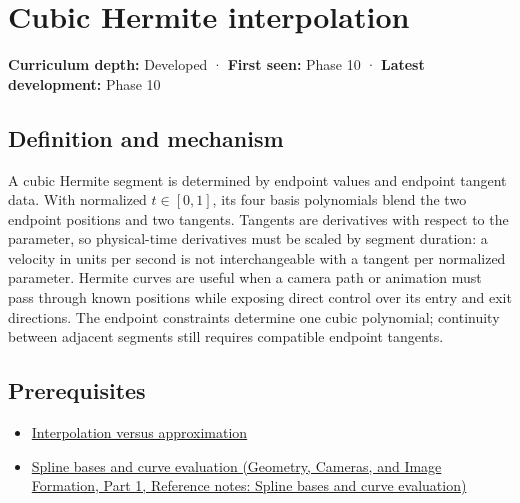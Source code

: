 \hypertarget{appendix-db3aef8f2fd6}{}\label{referencestart:appendix-db3aef8f2fd6}
\section{Cubic Hermite interpolation}\label{appendix-db3aef8f2fd6-cubic-hermite-interpolation}

\hypertarget{appendix-db3aef8f2fd6-cubic-hermite-interpolation}{}

\textbf{Curriculum depth:} Developed · \textbf{First seen:} Phase 10 · \textbf{Latest development:} Phase 10

\begin{allmightroledefinition}

\subsection{Definition and mechanism}\label{appendix-db3aef8f2fd6-definition-and-mechanism}

\hypertarget{appendix-db3aef8f2fd6-definition-and-mechanism}{}

A cubic Hermite segment is determined by endpoint values and endpoint tangent data. With normalized \(t\in[0,1]\), its four basis polynomials blend the two endpoint positions and two tangents. Tangents are derivatives with respect to the parameter, so physical-time derivatives must be scaled by segment duration: a velocity in units per second is not interchangeable with a tangent per normalized parameter. Hermite curves are useful when a camera path or animation must pass through known positions while exposing direct control over its entry and exit directions. The endpoint constraints determine one cubic polynomial; continuity between adjacent segments still requires compatible endpoint tangents.

\end{allmightroledefinition}

\subsection{Prerequisites}\label{appendix-db3aef8f2fd6-prerequisites}

\hypertarget{appendix-db3aef8f2fd6-prerequisites}{}

\begin{itemize}
\tightlist
\item
  \hyperref[appendix-0c2a5f69851e]{Interpolation versus approximation}
\item
  \href{../03-Geometry-Cameras-and-Image-Formation-P01/main.pdf\#appendix-f28eeec97a3d}{Spline bases and curve evaluation (Geometry, Cameras, and Image Formation, Part 1, Reference notes: Spline bases and curve evaluation)}
\end{itemize}

